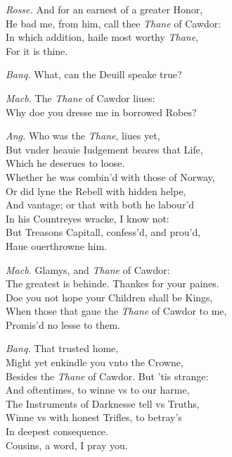 \documentclass[12pt]{sides}
\newcommand{\dia}[1]{\hskip 10pt\textit{#1}\hskip 6pt}
\begin{document}
\begin{multicols}{2}
            \dia{Rosse.} And for an earnest of a greater Honor, \\ He bad me, from him, call thee \textit{Thane} of Cawdor: \\ In which addition, haile most worthy \textit{Thane}, \\ For it is thine.

            \dia{Banq.} What, can the Deuill speake true?

            \dia{Macb.} The \textit{Thane} of Cawdor liues: \\ Why doe you dresse me in borrowed Robes?

            \dia{Ang.} Who was the \textit{Thane}, liues yet, \\ But vnder heauie Iudgement beares that Life, \\ Which he deserues to loose. \\ Whether he was combin'd with those of Norway, \\ Or did lyne the Rebell with hidden helpe, \\ And vantage; or that with both he labour'd \\ In his Countreyes wracke, I know not: \\ But Treasons Capitall, confess'd, and prou'd, \\ Haue ouerthrowne him.

            \dia{Macb.} Glamys, and \textit{Thane} of Cawdor: \\ The greatest is behinde. Thankes for your paines. \\ Doe you not hope your Children shall be Kings, \\ When those that gaue the \textit{Thane} of Cawdor to me, \\ Promis'd no lesse to them.

            \dia{Banq.} That trusted home, \\ Might yet enkindle you vnto the Crowne, \\ Besides the \textit{Thane} of Cawdor. But 'tis strange: \\ And oftentimes, to winne vs to our harme, \\ The Instruments of Darknesse tell vs Truths, \\ Winne vs with honest Trifles, to betray's \\ In deepest consequence. \\ Cousins, a word, I pray you.


\end{multicols}
\end{document}
